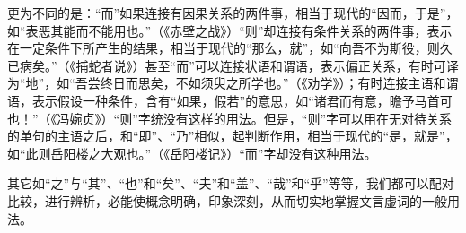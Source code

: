 更为不同的是：“而”如果连接有因果关系的两件事，相当于现代的“因而，于是”，如“表恶其能而不能用也。”（《赤壁之战》）“则”却连接有条件关系的两件事，表示在一定条件下所产生的结果，相当于现代的“那么，就”，如“向吾不为斯役，则久已病矣。”（《捕蛇者说》）甚至“而”可以连接状语和谓语，表示偏正关系，有时可译为“地”，如“吾尝终日而思矣，不如须臾之所学也。”（《劝学》）；有时连接主语和谓语，表示假设一种条件，含有“如果，假若”的意思，如“诸君而有意，瞻予马首可也！”（《冯婉贞》）“则”字统没有这样的用法。但是，“则”字可以用在无对待关系的单句的主语之后，和“即”、“乃”相似，起判断作用，相当于现代的“是，就是”，如“此则岳阳楼之大观也。”（《岳阳楼记》）“而”字却没有这种用法。

其它如“之”与“其”、“也”和“矣”、“夫”和“盖”、“哉”和“乎”等等，我们都可以配对比较，进行辨析，必能使概念明确，印象深刻，从而切实地掌握文言虚词的一般用法。
\newpage